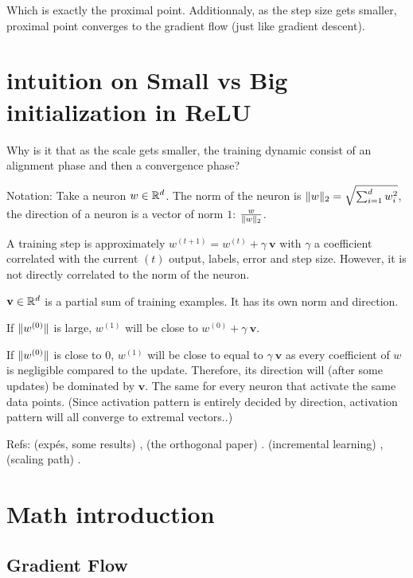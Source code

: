 Which is exactly the proximal point. Additionnaly, as the step size gets smaller, proximal point converges to the gradient flow (just like gradient descent).

\section{intuition on Small vs Big initialization in ReLU}

Why is it that as the scale gets smaller, the training dynamic consist of an alignment phase and then a convergence phase?

Notation: Take a neuron $w \in \mathbb{R}^d$. The norm of the neuron is $\lVert w\rVert_2 = \sqrt{\sum_{i=1}^{d} w_i^2}$, the direction of a neuron is a vector of norm $1$: $\frac{w}{\lVert w\rVert_2}$.

A training step is approximately $w^{(t+1)} = w^{(t)} + \gamma ~ \mathbf{v}$ with $\gamma$ a coefficient correlated with the current $(t)$ output, labels, error and step size. However, it is not directly correlated to the norm of the neuron.

$\mathbf{v} \in \mathbb{R}^d$ is a partial sum of training examples. It has its own norm and direction.

If $\lVert w^{(0)}\rVert$ is large, $w^{(1)}$ will be close to $w^{(0)} + \gamma ~ \mathbf{v}$.

If $\lVert w^{(0)}\rVert$ is close to 0, $w^{(1)}$ will be close to equal to $\gamma ~ \mathbf{v}$ as every coefficient of $w$ is negligible compared to the update. Therefore, its direction will (after some updates) be dominated by $\mathbf{v}$. The same for every neuron that activate the same data points. (Since activation pattern is entirely decided by direction, activation pattern will all converge to extremal vectors..)

Refs: (expés, some results) \citep{maennel2018gradient}, (the orthogonal paper) \citep{boursierGradientFlowDynamics2022}. (incremental learning) \citep{berthierIncrementalLearningDiagonal}, (scaling path) \citep{neumayerEffectInitializationScaling2023}.


\section{Math introduction}

\subsection{Gradient Flow}

